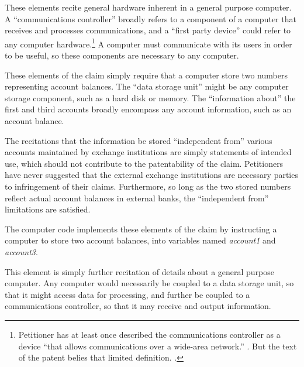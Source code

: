 \documentclass{scotus}
\begin{document}

These elements recite general hardware inherent in a general purpose computer. A
``communications controller'' broadly refers to a component of a computer that
receives and processes communications, and a ``first party device'' could refer
to any computer hardware.\footnote{Petitioner has at least once
described the communications controller as a device ``that allows communications
over a wide-area network.'' . But the text of the
patent belies that limited definition. .} A computer must communicate with its users in order to be useful,
so these components are necessary to any computer.


These elements of the claim simply require that a computer store two numbers
representing account balances. The ``data storage unit'' might be any computer
storage component, such as a hard disk or memory. The ``information about'' the
first and third accounts broadly encompass any account information, such as an
account balance.

The recitations that the information be stored ``independent from'' various
accounts maintained by exchange institutions are simply statements of intended
use, which should not contribute to the patentability of the claim. Petitioners
have never suggested that the external exchange institutions are necessary
parties to infringement of their claims. Furthermore, so long as the two stored
numbers reflect actual account balances in external banks, the ``independent
from'' limitations are satisfied.

The computer code implements these elements of the claim by instructing a
computer to store two account balances, into variables named \emph{account1} and
\emph{account3}.


This element is simply further recitation of details about a general purpose
computer. Any computer would necessarily be coupled to a data storage unit, so
that it might access data for processing, and further be coupled to a
communications controller, so that it may receive and output information.
\end{document}
